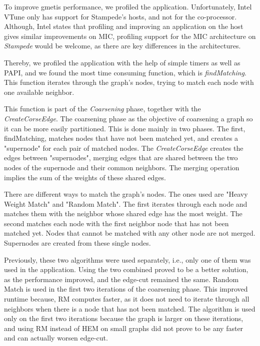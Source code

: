 \documentclass[abstract=on,9pt,twocolumn]{scrartcl}
\begin{document}
To improve gmetis performance, we profiled the application.
Unfortunately, Intel VTune only has support for Stampede's hosts, and
not for the co-processor. Although, Intel states that profiling and
improving an application on the host gives similar improvements on MIC,
profiling support for the MIC architecture on \textit{Stampede} would be
welcome, as there are key differences in the architectures.

Thereby, we profiled the application with the help of simple timers as
well as PAPI, and we found the most time consuming function, which is
\textit{findMatching}. This function iterates through the graph's nodes,
trying to match each node with one available neighbor.

This function is part of the \textit{Coarsening} phase, together with
the \textit{CreateCorseEdge}.
The coarsening phase as the objective of coarsening a graph so it can be
more easily partitioned. This is done mainly in two phases. The first,
findMatching, matches nodes that have not been matched yet, and creates
a "supernode" for each pair of matched nodes. The
\textit{CreateCorseEdge} creates the edges between "supernodes", merging
edges that are shared between the two nodes of the supernode and their
common neighbors. The merging operation implies the sum of the weights
of these shared edges.

There are different ways to match the graph's nodes. The ones used are
"Heavy Weight Match" and "Random Match". The first iterates through each
node and matches them with the neighbor whose shared edge has the most
weight. The second matches each node with the first neighbor node that
has not been matched yet. Nodes that cannot be matched with any other
node are not merged. Supernodes are created from these single nodes.

Previously, these two algorithms were used separately, i.e., only one of
them was used in the application. Using the two combined proved to be a
better solution, as the performance improved, and the edge-cut remained
the same. Random Match is used in the first two iterations of the
coarsening phase. This improved runtime because, RM computes faster, as
it does not need to iterate through all neighbors when there is a node
that has not been matched. The algorithm is used only on the first two
iterations because the graph is larger on these iterations, and using RM
instead of HEM on small graphs did not prove to be any faster and can
actually worsen edge-cut.
\end{document}
